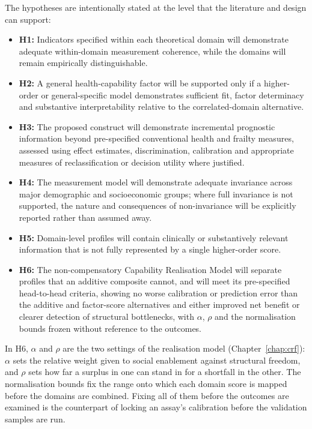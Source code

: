 The hypotheses are intentionally stated at the level that the literature and design can support:
\begin{itemize}
    \item \textbf{H1:} Indicators specified within each theoretical domain will demonstrate adequate within-domain measurement coherence, while the domains will remain empirically distinguishable.
    \item \textbf{H2:} A general health-capability factor will be supported only if a higher-order or general-specific model demonstrates sufficient fit, factor determinacy and substantive interpretability relative to the correlated-domain alternative.
    \item \textbf{H3:} The proposed construct will demonstrate incremental prognostic information beyond pre-specified conventional health and frailty measures, assessed using effect estimates, discrimination, calibration and appropriate measures of reclassification or decision utility where justified.
    \item \textbf{H4:} The measurement model will demonstrate adequate invariance across major demographic and socioeconomic groups; where full invariance is not supported, the nature and consequences of non-invariance will be explicitly reported rather than assumed away.
    \item \textbf{H5:} Domain-level profiles will contain clinically or substantively relevant information that is not fully represented by a single higher-order score.
    \item \textbf{H6:} The non-compensatory Capability Realisation Model will separate profiles that an additive composite cannot, and will meet its pre-specified head-to-head criteria, showing no worse calibration or prediction error than the additive and factor-score alternatives and either improved net benefit or clearer detection of structural bottlenecks, with $\alpha$, $\rho$ and the normalisation bounds frozen without reference to the outcomes.
\end{itemize}

In H6, $\alpha$ and $\rho$ are the two settings of the realisation model (Chapter~\ref{chap:crf}): $\alpha$ sets the relative weight given to social enablement against structural freedom, and $\rho$ sets how far a surplus in one can stand in for a shortfall in the other. The normalisation bounds fix the range onto which each domain score is mapped before the domains are combined. Fixing all of them before the outcomes are examined is the counterpart of locking an assay's calibration before the validation samples are run.


